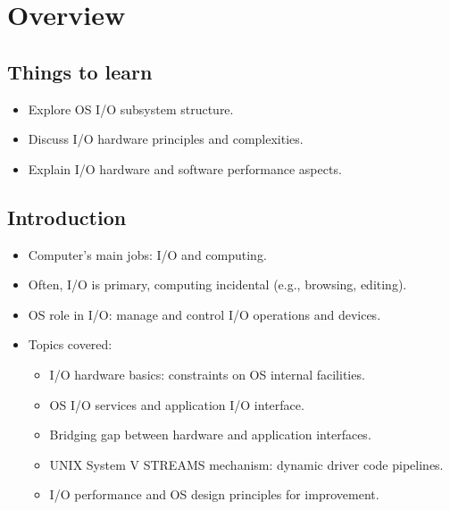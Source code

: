 \section{Overview}

\subsection{Things to learn}
\begin{itemize}
    \item Explore OS I/O subsystem structure.
    \item Discuss I/O hardware principles and complexities.
    \item Explain I/O hardware and software performance aspects.
\end{itemize}

\subsection{Introduction}
\begin{itemize}
    \item Computer's main jobs: I/O and computing.
    \item Often, I/O is primary, computing incidental (e.g., browsing, editing).
    \item OS role in I/O: manage and control I/O operations and devices.
    \item Topics covered:
    \begin{itemize}
        \item I/O hardware basics: constraints on OS internal facilities.
        \item OS I/O services and application I/O interface.
        \item Bridging gap between hardware and application interfaces.
        \item UNIX System V STREAMS mechanism: dynamic driver code pipelines.
        \item I/O performance and OS design principles for improvement.
    \end{itemize}
\end{itemize}

